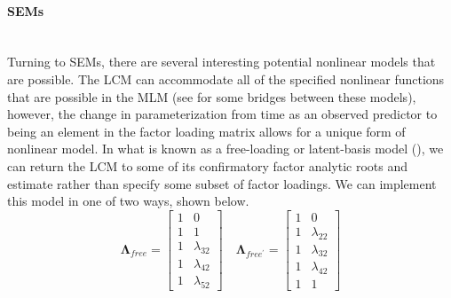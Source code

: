 \documentclass[11pt]{article}
\newcommand{\subsubsubsection}[1]{\paragraph{#1}\mbox{}\\}  %
\begin{document}
\subsubsubsection{SEMs}
Turning to SEMs, there are several interesting potential nonlinear models that are possible. The LCM can accommodate all of the specified nonlinear functions that are possible in the MLM (see \cite{bauer_estimating_2003,curran_have_2003,preacher_meaningful_2015} for some bridges between these models), however, the change in parameterization from time as an observed predictor to being an element in the factor loading matrix allows for a unique form of nonlinear model. In what is known as a free-loading or latent-basis model (\cite{mcardle_latent_2009}), we can return the LCM to some of its confirmatory factor analytic roots and estimate rather than specify some subset of factor loadings. We can implement this model in one of two ways, shown below.
%
\begin{equation} \label{eq:21}
\boldsymbol{\Lambda}_{free} = \left[ \begin{array}{cc} 1 & 0 \\ 1 & 1 \\ 1 & \lambda_{32} \\ 1 & \lambda_{42} \\ 1 & \lambda_{52} \end{array} \right] \quad
\boldsymbol{\Lambda}_{free^{\prime}} = \left[ \begin{array}{cc} 1 & 0 \\ 1 & \lambda_{22} \\ 1 & \lambda_{32} \\ 1 & \lambda_{42} \\ 1 & 1 \end{array} \right]
\end{equation}
%
\end{document}
